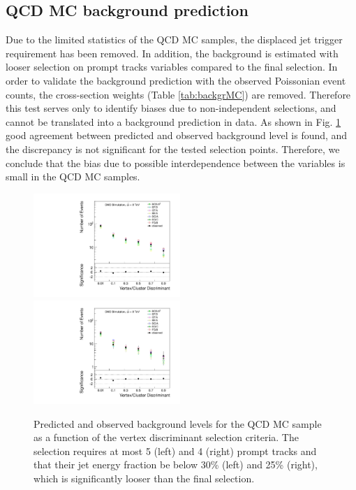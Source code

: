 \subsection{QCD MC background prediction}
\label{subsec:bkgQCDMC}

Due to the limited statistics of the QCD MC samples, the displaced jet trigger requirement has been removed. In addition, the background is estimated with looser
 selection on prompt tracks variables compared to the final selection. 
In order to validate the background prediction with 
the observed Poissonian event counts, the cross-section weights (Table \ref{tab:backgrMC}) 
are removed. 
Therefore this test serves only to identify biases due to non-independent selections,
and cannot be translated
into a background prediction in data.  
As shown in Fig. \ref{fig:bkg_MC} good agreement between predicted and observed background level is found, 
and the discrepancy is not significant for the tested selection points. Therefore, we conclude that the  
bias due to possible interdependence between the variables is small in the QCD MC samples. 

\begin{figure}[htbp]
  \centering
  \includegraphics[width=0.495\textwidth]{plots/background/bkg_MC1.pdf}
  \includegraphics[width=0.495\textwidth]{plots/background/bkg_MC2.pdf}
  \caption{Predicted and observed background levels for the QCD MC sample as a function of the vertex discriminant selection criteria.
The selection requires at most 5 (left) and 4 (right)  prompt tracks and that their jet energy fraction be below 30\% (left) and 25\% (right), which
is significantly looser than the final selection. \label{fig:bkg_MC}}
  \end{figure}


